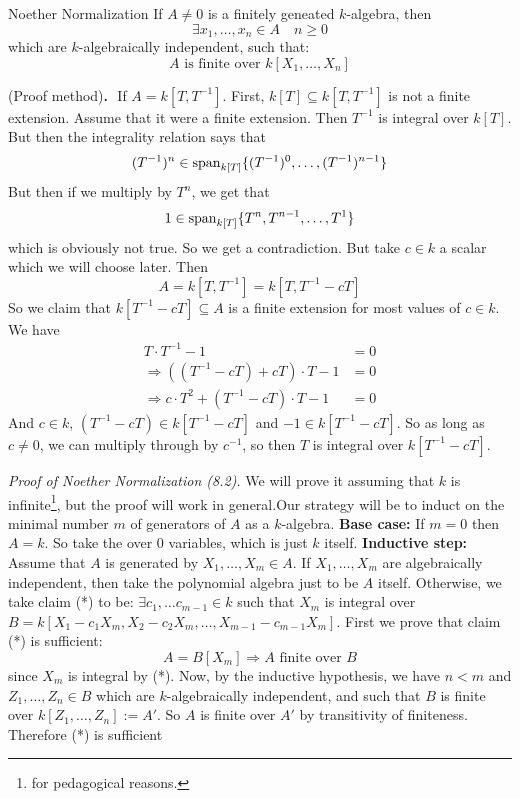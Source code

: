 \documentclass{article}
\begin{document}
\begin{fancythm}{Noether Normalization}
    If $A \neq 0$ is a finitely geneated $k$-algebra, then \[ \exists x_{1}, \dots, x_{n} \in A \,\,\,\,\,\, n\geq 0\] which are $k$-algebraically independent, such that: \[ A \text{ is finite over } k[X_{1},\dots, X_{n}]\]
\end{fancythm}
\begin{ex*} (Proof method)\textbf{.}\,\, 
    If $A = k[T,T^{-1}]$.\gap 
    First, $k[T] \subseteq k[T,T^{-1}]$ is not a finite extension.
    \proof Assume that it were a finite extension. Then $T^{-1}$ is integral over $k[T]$. But then the integrality relation says that \[ (T^{-1})^{n} \in \operatorname{span}_{k[T]}\{(T^{-1})^{0}, \dots, (T^{-1})^{n-1} \}\]
    But then if we multiply by $T^{n}$, we get that \[ 1 \in \operatorname{span}_{k[T]} \{ T^{n}, T^{n-1}, \dots, T^{1}\}\] 
    which is obviously not true. So we get a contradiction.
    \endproof
    But take $c \in k$ a scalar which we will choose later. Then \[A = k[T,T^{-1}] = k[T,T^{-1}-cT]\]
    So we claim that $k[T^{-1}-cT] \subseteq A$ is a finite extension for most values of $c \in k$.
    \proof We have 
    \begin{align*}
        T \cdot T^{-1} -1 &= 0 \\
        \Rightarrow ((T^{-1}-cT) + cT)\cdot T -1 &= 0\\
        \Rightarrow c \cdot T^{2} + (T^{-1}-cT) \cdot T -1 &= 0
    \end{align*}
    And $c \in k$, $(T^{-1}-cT) \in k[T^{-1}-cT]$ and $-1 \in k[T^{-1} - cT]$. So as long as $c \neq 0$, we can multiply through by $c^{-1}$, so then $T$ is integral over $k[T^{-1}-cT]$.
\end{ex*}
\textit{Proof of Noether Normalization (8.2).}
We will prove it assuming that $k$ is infinite\footnote{for pedagogical reasons.}, but the proof will work in general.\gap Our strategy will be to induct on the minimal number $m$ of generators of $A$ as a $k$-algebra.\gap 
\textbf{Base case:} If $m=0$ then $A=k$. So take the  over $0$ variables, which is just $k$ itself.\gap 
\textbf{Inductive step:} Assume that $A$ is generated by $X_{1}, \dots, X_{m} \in A$. If $X_{1},\dots,X_{m}$ are algebraically independent, then take the polynomial algebra just to be $A$ itself. \gap 
Otherwise, we take claim (*) to be: $\exists c_{1}, \dots c_{m-1} \in k$ such that $X_{m}$ is integral over $B = k[X_{1} - c_{1}X_{m}, X_{2}-c_{2}X_{m}, \dots, X_{m-1}-c_{m-1}X_{m}]$.\gap 
First we prove that claim (*) is sufficient: 
\[ A = B[X_{m}] \Rightarrow A \text{ finite over } B\] since $X_{m}$ is integral by (*). Now, by the inductive hypothesis, we have $n<m$ and $Z_{1}, \dots, Z_{n} \in B$ which are $k$-algebraically independent, and such that $B$ is finite over $k[Z_{1},\dots, Z_{n}] := A'$. So $A$ is finite over $A'$ by transitivity of finiteness. Therefore (*) is sufficient \gap 
\end{document}
